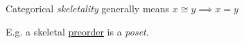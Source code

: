 Categorical \emph{skeletality} generally means $x \cong y \implies x = y$

E.g. a skeletal \href{doc/1 math/Seven Sketches in Compositionality/1 Chapter 1: Generative Effects/3 Preorders/Preorder}{preorder} is a \emph{poset}.